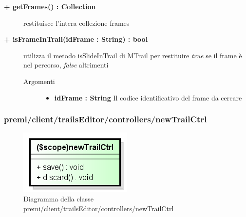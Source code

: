 \begin{description}
	\begin{description}
		\item[\textbf{\color{blue}+ getFrames() : Collection		}] \hfill
			restituisce l'intera collezione frames
	\end{description}
	
	
	\begin{description}
		\item[\textbf{\color{blue}+ isFrameInTrail(idFrame : String) : bool			}] \hfill
			utilizza il metodo isSlideInTrail di MTrail per restituire \textit{true} se il frame è nel percorso, \textit{false} altrimenti
			
		\begin{description}
			\item[Argomenti] \hfill
				\begin{itemize}
				
					\item \textbf{idFrame : String			} \hfill
					Il codice identificativo del frame da cercare
					
				\end{itemize}
			
		\end{description}
	\end{description}
	
\end{description}	
	
	
	
	
	
	
	
	
	
	
\subsubsection{premi/client/trailsEditor/controllers/newTrailCtrl}
\begin{figure}[h]
\begin{center}
\includegraphics[scale=0.55]{img/diacla/newTrailCtrl.png}
\caption{Diagramma della classe premi/client/trailsEditor/controllers/newTrailCtrl}
\end{center}
\end{figure}


